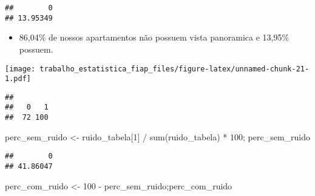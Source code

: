 \documentclass[
]{article}
\newenvironment{Shaded}{\begin{snugshade}}{\end{snugshade}}
\newcommand{\AttributeTok}[1]{\textcolor[rgb]{0.77,0.63,0.00}{#1}}
\newcommand{\DecValTok}[1]{\textcolor[rgb]{0.00,0.00,0.81}{#1}}
\newcommand{\FunctionTok}[1]{\textcolor[rgb]{0.00,0.00,0.00}{#1}}
\newcommand{\NormalTok}[1]{#1}
\newcommand{\OtherTok}[1]{\textcolor[rgb]{0.56,0.35,0.01}{#1}}
\newcommand{\SpecialCharTok}[1]{\textcolor[rgb]{0.00,0.00,0.00}{#1}}
\providecommand{\tightlist}{%
  \setlength{\itemsep}{0pt}\setlength{\parskip}{0pt}}
\begin{document}
\begin{verbatim}
##        0 
## 13.95349
\end{verbatim}

\begin{itemize}
\tightlist
\item
  86,04\% de nossos apartamentos não possuem vista panoramica e 13,95\%
  possuem.
\end{itemize}

\begin{Shaded}
\end{Shaded}

\texttt{[image: trabalho\_estatistica\_fiap\_files/figure-latex/unnamed-chunk-21-1.pdf]}

\begin{Shaded}
\end{Shaded}

\begin{verbatim}
## 
##   0   1 
##  72 100
\end{verbatim}

\begin{Shaded}
\begin{Highlighting}[]
\NormalTok{perc\_sem\_ruido }\OtherTok{\textless{}{-}}\NormalTok{ ruido\_tabela[}\DecValTok{1}\NormalTok{] }\SpecialCharTok{/} \FunctionTok{sum}\NormalTok{(ruido\_tabela) }\SpecialCharTok{*} \DecValTok{100}\NormalTok{; perc\_sem\_ruido}
\end{Highlighting}
\end{Shaded}

\begin{verbatim}
##        0 
## 41.86047
\end{verbatim}

\begin{Shaded}
\begin{Highlighting}[]
\NormalTok{perc\_com\_ruido }\OtherTok{\textless{}{-}} \DecValTok{100} \SpecialCharTok{{-}}\NormalTok{ perc\_sem\_ruido;perc\_com\_ruido}
\end{Highlighting}
\end{Shaded}
\end{document}
